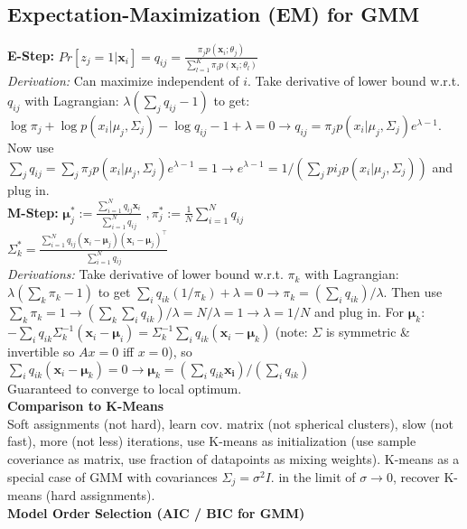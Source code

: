 \subsection*{Expectation-Maximization (EM) for GMM}
\textbf{E-Step:}
$Pr[z_{j}=1|\mathbf{x}_i] = q_{ij}=\frac{\pi_j p(\mathbf{x}_i;\theta_j)}{\sum_{l=1}^K \pi_l p(\mathbf{x}_i;\theta_l)}$ \\
\textit{Derivation:} Can maximize independent of $i$. Take derivative of lower bound w.r.t. $q_{ij}$ with Lagrangian: $\lambda(\sum_j q_{ij} -1)$ to get: $\log \pi_j +\log p(x_i|\mu_j, \Sigma_j)-\log q_{ij} - 1 + \lambda = 0 \to q_{ij}=\pi_j p(x_i|\mu_j, \Sigma_j) e^{\lambda-1}$. Now use $\sum_j q_{ij}=\sum_j \pi_j p(x_i|\mu_j, \Sigma_j)e^{\lambda-1}=1 \to e^{\lambda -1}= 1/(\sum_j pi_j p(x_i|\mu_j, \Sigma_j))$ and plug in. 
\\
\textbf{M-Step:} 
$\boldsymbol{\mu}_j^{*} := \frac{\sum_{i=1}^N q_{ij} \mathbf{x}_i}{\sum_{i=1}^N q_{ij}}$
$, \pi_j^* := \frac{1}{N} \sum_{i=1}^N q_{ij}$\\
$\Sigma_k^{*} = \frac{\sum_{i=1}^N q_{ij} (\mathbf{x}_i - \boldsymbol{\mu}_j)(\mathbf{x}_i - \boldsymbol{\mu}_j)^\top}{\sum_{i=1}^N q_{ij}}$\\
\textit{Derivations:}  Take derivative of lower bound w.r.t. $\pi_k$ with Lagrangian: $\lambda (\sum_k \pi_k - 1)$ to get $\sum_i q_{ik} (1 / \pi_k) + \lambda = 0 \to \pi_k = (\sum_i q_{ik}) / \lambda$. Then use $\sum_k \pi_k=1 \to (\sum_k \sum_i q_{ik})/\lambda = N / \lambda = 1 \to \lambda = 1 / N$ and plug in. For $\mathbf{\mu}_k$: $-\sum_i q_{ik} \Sigma_k^{-1}(\mathbf{x}_i - \mathbf{\mu}_i)=\Sigma_k^{-1}\sum_i q_{ik}(\mathbf{x}_i - \mathbf{\mu}_k)$ (note: $\Sigma$ is symmetric \& invertible so $Ax=0$ iff $x=0$), so $\sum_i q_{ik}(\mathbf{x}_i - \mathbf{\mu}_k) = 0 \to \mathbf{\mu}_k = (\sum_i q_{ik}\mathbf{x_i}) / (\sum_i q_{ik})$
\\
Guaranteed to converge to local optimum. \\
\textbf{Comparison to K-Means}\\
Soft assignments (not hard), learn cov. matrix (not spherical clusters), slow (not fast), more (not less) iterations, use K-means as initialization (use sample coveriance as matrix, use fraction of datapoints as mixing weights). K-means as a special case of GMM with covariances $\Sigma_j = \sigma^2 I$. in the limit of $\sigma \rightarrow 0$, recover K-means (hard assignments). \\
\textbf{Model Order Selection (AIC / BIC for GMM)}\\
